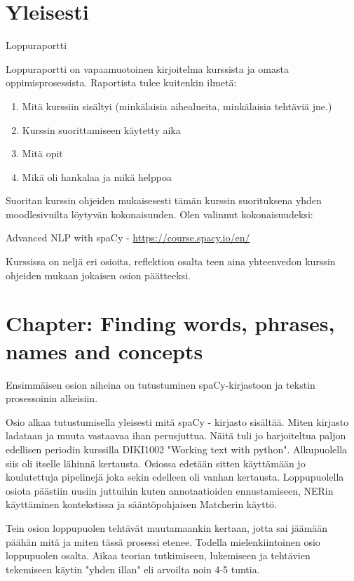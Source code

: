 \documentclass{article}
\begin{document}
\pagestyle{fancy}
\fancyhead{} %



 \section*{Yleisesti}

 Loppuraportti

Loppuraportti on vapaamuotoinen kirjoitelma kurssista ja omasta oppimisprosessista. Raportista tulee kuitenkin ilmetä:
\begin{enumerate}
    \item     Mitä kurssiin sisältyi (minkälaisia aihealueita, minkälaisia tehtäviä jne.)
    \item     Kurssin suorittamiseen käytetty aika 
    \item       Mitä opit
    \item     Mikä oli hankalaa ja mikä helppoa
\end{enumerate}

    Suoritan kurssin ohjeiden mukaisesesti tämän kurssin suorituksena yhden moodlesivuilta löytyvän kokonaisuuden. Olen valinnut kokonaisuudeksi: 

    Advanced NLP with spaCy - \url{https://course.spacy.io/en/}

    Kurssissa on neljä eri osioita, reflektion osalta teen aina yhteenvedon kurssin ohjeiden mukaan jokaisen osion päätteeksi.

\section{Chapter: Finding words, phrases, names and concepts}

Ensimmäisen osion aiheina on tutustuminen spaCy-kirjastoon ja tekstin prosessoinin alkeisiin.

Osio alkaa tutustumisella yleisesti mitä spaCy - kirjasto sisältää. Miten kirjasto ladataan ja muuta vastaavaa ihan perusjuttua. Näitä tuli jo harjoiteltua paljon edellisen periodin kurssilla 
DIKI1002 "Working text with python". Alkupuolella siis oli itselle lähinnä kertausta. Osiossa edetään sitten käyttämään jo koulutettuja pipelinejä joka sekin edelleen oli vanhan kertausta. Loppupuolella osiota päästiin uusiin juttuihin kuten annotaatioiden ennustamiseen, NERin käyttäminen kontekstissa ja sääntöpohjaisen Matcherin käyttö.

Tein osion loppupuolen tehtävät muutamaankin kertaan, jotta sai jäämään päähän mitä ja miten tässä prosessi etenee. Todella mielenkiintoinen osio loppupuolen osalta. Aikaa teorian tutkimiseen, lukemiseen ja tehtävien tekemiseen käytin "yhden illan"  eli arvoilta noin 4-5 tuntia.
\end{document}
